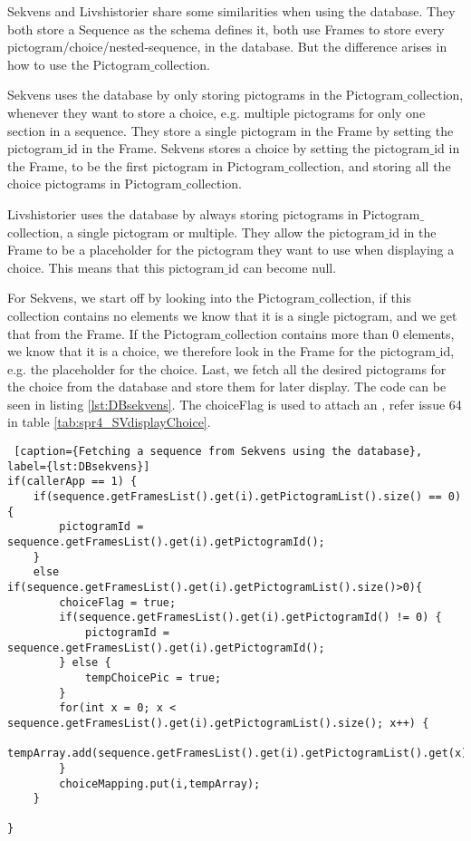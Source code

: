 Sekvens and Livshistorier share some similarities when using the database. They both store a Sequence as the schema defines it, both use Frames to store every pictogram/choice/nested-sequence, in the database. But the difference arises in how to use the Pictogram$\_$collection.

Sekvens uses the database by only storing pictograms in the Pictogram$\_$collection, whenever they want to store a choice, e.g. multiple pictograms for only one section in a sequence. They store a single pictogram in the Frame by setting the pictogram$\_$id in the Frame. Sekvens stores a choice by setting the pictogram$\_$id in the Frame, to be the first pictogram in Pictogram$\_$collection, and storing all the choice pictograms in Pictogram$\_$collection.

Livshistorier uses the database by always storing pictograms in Pictogram$\_$collection, a single pictogram or multiple. They allow the pictogram$\_$id in the Frame to be a placeholder for the pictogram they want to use when displaying a choice. This means that this pictogram$\_$id can become null.

For Sekvens, we start off by looking into the Pictogram$\_$collection, if this collection contains no elements we know that it is a single pictogram, and we get that from the Frame. If the Pictogram$\_$collection contains more than 0 elements, we know that it is a choice, we therefore look in the Frame for the pictogram$\_$id, e.g. the placeholder for the choice. Last, we fetch all the desired pictograms for the choice from the database and store them for later display. The code can be seen in listing \ref{lst:DBsekvens}. The choiceFlag is used to attach an , refer issue 64 in table \ref{tab:spr4_SVdisplayChoice}.
\begin{lstlisting} [caption={Fetching a sequence from Sekvens using the database}, label={lst:DBsekvens}]
if(callerApp == 1) {
	if(sequence.getFramesList().get(i).getPictogramList().size() == 0) {
		pictogramId = sequence.getFramesList().get(i).getPictogramId();
	}
	else if(sequence.getFramesList().get(i).getPictogramList().size()>0){
		choiceFlag = true;
		if(sequence.getFramesList().get(i).getPictogramId() != 0) {
			pictogramId = sequence.getFramesList().get(i).getPictogramId();
		} else {
			tempChoicePic = true;
		}
		for(int x = 0; x < sequence.getFramesList().get(i).getPictogramList().size(); x++) {
			tempArray.add(sequence.getFramesList().get(i).getPictogramList().get(x).getId());
		}
		choiceMapping.put(i,tempArray);
	}

}
\end{lstlisting}


